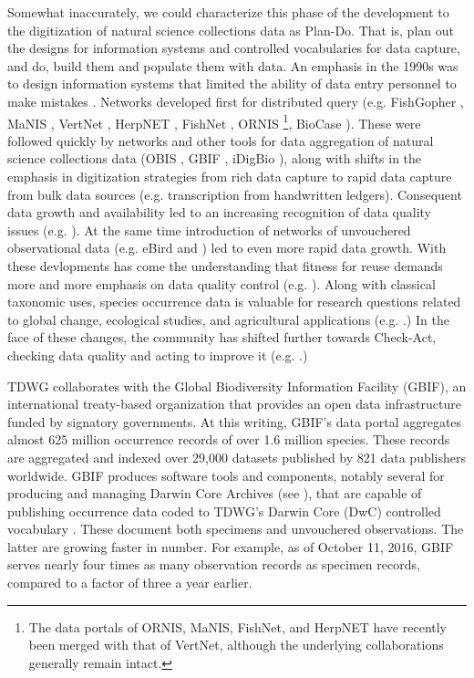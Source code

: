 \documentclass{article}
\begin{document}
Somewhat inaccurately,
we could characterize this phase of the development to the digitization of natural science collections data as Plan-Do. That is, plan out the designs for information systems and controlled vocabularies for data capture, and do, build them and populate them with data.   An emphasis in the 1990s was to design information systems that limited the ability of data entry personnel to make mistakes \citep{MorrisP2005}.  
Networks developed first for distributed query (e.g. FishGopher \citep[see][p.92]{wiley_biodiversity_2004}, MaNIS \citep{BI7, manishome_2015}, VertNet \citep{VertNetAbout}, HerpNET \citep{herpnet_2016}, FishNet \citep{fishnet_2016}, ORNIS \citep{ornis_2016}\footnote{The data portals of ORNIS, MaNIS, FishNet, and HerpNET have recently been merged with that of VertNet, although the underlying collaborations generally remain intact.}, BioCase \citep{BioCase_2015}).
These were followed quickly by networks and other tools for data aggregation of natural science collections data (OBIS \citep{OBIS2011}, GBIF \citep{GBIF2015},  iDigBio \citep{iDigBio2015}), along with shifts in the emphasis in digitization strategies from rich data capture to rapid data capture from bulk data sources (e.g. transcription from handwritten ledgers).
Consequent data growth and availability led to an increasing recognition of data quality issues (e.g. \citep{Frey200616}).
At the same time introduction of networks of unvouchered observational data (e.g. eBird  \citep{sullivan_ebird:_2009} and \citep{Ahumada2703}) led to even more rapid data growth. 
With these devlopments has come the understanding that fitness for reuse demands more and more emphasis on data quality control (e.g. \citep{chapman_principles_2005}). Along with classical taxonomic uses, species occurrence data is valuable for research questions related to global change, ecological studies, and agricultural applications (e.g. \citep{brooke_why_2000,Graham2004497}.)  In the face of these changes, the community has shifted further towards Check-Act, checking data quality and acting to improve it (e.g. \citep{eBirdQC}.)  

TDWG collaborates with the Global Biodiversity Information Facility (GBIF), an international treaty-based organization that provides an open data infrastructure funded by signatory governments. 
At this writing, GBIF's data portal aggregates almost 625 million occurrence records of over 1.6 million species. These records are aggregated and indexed over 29,000 datasets published by 821 data publishers worldwide. GBIF produces software tools and components, notably several for producing and managing Darwin Core Archives (see \citep{GBIF_DWCA}), that are capable of publishing occurrence data coded to TDWG's Darwin Core (DwC) controlled vocabulary \citep{wieczorek_darwin_2012, tdwg_darwin_2015}. 
These document both specimens and unvouchered observations. The latter are growing faster in number. For example, as of October 11, 2016, GBIF serves nearly four times as many observation records as specimen records, compared to a factor of three a year earlier.
\end{document}
